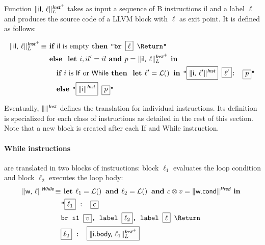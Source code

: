 \documentclass{llncs}
\newcommand{\trad}[2]{\ensuremath{\lVert \textsf{#1} \rVert^{\textit{#2}}}}
\newcommand{\nl}[0]{\text{\Return}}
\DeclareMathOperator{\isdef}{\equiv}
\DeclareMathOperator{\name}{\mathcal{L}()}
\newcommand{\llvm}[1]{\texttt{#1}}
\newcommand{\B}[1]{\textsf{#1}}
\newcommand{\ListOf}[1]{$\mbox{#1}^+$}
\newcommand{\IF}[0]{\textbf{ if }}
\newcommand{\ELSE}[0]{\textbf{ else }}
\newcommand{\THEN}[0]{\textbf{ then }}
\newcommand{\LET}[0]{\textbf{ let }}
\newcommand{\IN}[0]{\textbf{ in }}
\newcommand{\AND}[0]{\textbf{ and }}
\newcommand{\PH}[1]{\framebox{$#1$}}
\newcommand{\sep}[0]{\otimes}
\begin{document}
Function $\trad{\B{il}, $\ell$}{\ListOf{\B{Inst}}}_L$ takes as input a sequence
of B instructions \B{il} and a label $\ell$ and produces the source code of a
LLVM block with $\ell$ as exit point. It is defined as follows:

\begin{align*}
\trad{\B{il}, $\ell$}{\ListOf{\B{Inst}}}_L \isdef & \IF \B{il} \mbox{ is empty} \THEN \llvm{"br \PH{\ell} \nl"} \\
& \ELSE \LET i, il' = il  \AND p = \trad{il, $\ell$}{\ListOf{\B{Inst}}}_L \IN \\
& \quad \IF i \mbox{ is \B{If} or \B{While}} \THEN \LET \ell' = \name \IN \llvm{"\PH{\trad{i, $\ell'$}{\B{Inst}}} \PH{\ell'}: \PH{p}"} \\
& \quad \ELSE \llvm{"\PH{\trad{i}{\B{Inst}}} \PH{p}"}
\end{align*}

Eventually, $\trad{}{\B{Inst}}$ defines the translation for individual
instructions. Its definition is specialized for each class of instructions as
detailed in the rest of this section. Note that a new block is created after
each \B{If} and \B{While} instruction.

\paragraph{While instructions} are translated in two blocks of instructions:
block $\ell_1$ evaluates the loop condition and block $\ell_2$ executes the loop
body:
\begin{align*}
\begin{split}
\trad{w, $\ell$}{\B{While}} \isdef 
  & \LET \ell_1 = \name \AND \ell_2 = \name \AND c \sep v = \trad{w.cond}{\B{Pred}} \IN \\
  & \llvm{"\PH{\ell_1} : \PH{c}} \\
  & \llvm{br i1 \PH{v}, label \PH{\ell_2}, label \PH{\ell} \nl} \\
  & \llvm{\PH{\ell_2} : \PH{\trad{i.body, $\ell_1$}{\ListOf{\B{Inst}}}_L}}
\end{split}
\end{align*}
\end{document}
